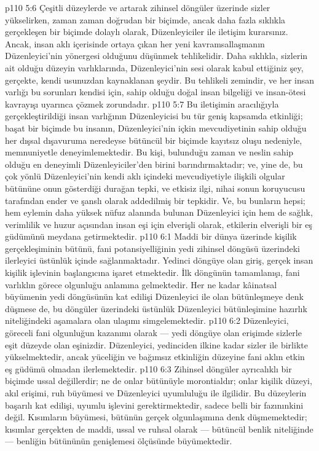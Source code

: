 \vs p110 5:6 Çeşitli düzeylerde ve artarak zihinsel döngüler üzerinde sizler yükselirken, zaman zaman doğrudan bir biçimde, ancak daha fazla sıklıkla gerçekleşen bir biçimde dolaylı olarak, Düzenleyiciler ile iletişim kurarsınız. Ancak, insan aklı içerisinde ortaya çıkan her yeni kavramsallaşmanın Düzenleyici’nin yönergesi olduğunu düşünmek tehlikelidir. Daha sıklıkla, sizlerin ait olduğu düzeyin varlıklarında, Düzenleyici’nin sesi olarak kabul ettiğiniz şey, gerçekte, kendi usunuzdan kaynaklanan şeydir. Bu tehlikeli zemindir, ve her insan varlığı bu sorunları kendisi için, sahip olduğu doğal insan bilgeliği ve insan\hyp{}ötesi kavrayışı uyarınca çözmek zorundadır.
\vs p110 5:7 Bu iletişimin aracılığıyla gerçekleştirildiği insan varlığının Düzenleyicisi bu tür geniş kapsamda etkinliği; başat bir biçimde bu insanın, Düzenleyici’nin içkin mevcudiyetinin sahip olduğu her dışsal dışavuruma neredeyse bütüncül bir biçimde kayıtsız oluşu nedeniyle, memnuniyetle deneyimlemektedir. Bu kişi, bulunduğu zaman ve neslin sahip olduğu en deneyimli Düzenleyiciler’den birini barındırmaktadır; ve, yine de, bu çok yönlü Düzenleyici’nin kendi aklı içindeki mevcudiyetiyle ilişkili olgular bütününe onun gösterdiği durağan tepki, ve etkisiz ilgi, nihai sonun koruyucusu tarafından ender ve şanslı olarak addedilmiş bir tepkidir. Ve, bu bunların hepsi; hem eylemin daha yüksek nüfuz alanında bulunan Düzenleyici için hem de sağlık, verimlilik ve huzur açısından insan eşi için elverişli olarak, etkilerin elverişli bir eş güdümünü meydana getirmektedir.
\vs p110 6:1 Maddi bir dünya üzerinde kişilik gerçekleşiminin bütünü, fani potansiyelliğinin yedi zihinsel döngüsü üzerindeki ilerleyici üstünlük içinde sağlanmaktadır. Yedinci döngüye olan giriş, gerçek insan kişilik işlevinin başlangıcına işaret etmektedir. İlk döngünün tamamlanışı, fani varlıklın görece olgunluğu anlamına gelmektedir. Her ne kadar kâinatsal büyümenin yedi döngüsünün kat edilişi Düzenleyici ile olan bütünleşmeye denk düşmese de, bu döngüler üzerindeki üstünlük Düzenleyici bütünleşimine hazırlık niteliğindeki aşamalara olan ulaşımı simgelemektedir.
\vs p110 6:2 Düzenleyici, göreceli fani olgunluğun kazanımı olarak --- yedi döngüye olan erişimde sizlerle eşit düzeyde olan eşinizdir. Düzenleyici, yedinciden ilkine kadar sizler ile birlikte yükselmektedir, ancak yüceliğin ve bağımsız etkinliğin düzeyine fani aklın etkin eş güdümü olmadan ilerlemektedir.
\vs p110 6:3 Zihinsel döngüler ayrıcalıklı bir biçimde ussal değillerdir; ne de onlar bütünüyle morontialdır; onlar kişilik düzeyi, akıl erişimi, ruh büyümesi ve Düzenleyici uyumluluğu ile ilgilidir. Bu düzeylerin başarılı kat edilişi,  uyumlu işlevini gerektirmektedir, sadece belli bir fazınınkini değil. Kısımların büyümesi, bütünün gerçek olgunlaşımına denk düşmemektedir; kısımlar gerçekten de maddi, ussal ve ruhsal olarak --- bütüncül benlik niteliğinde --- benliğin bütününün genişlemesi ölçüsünde büyümektedir.
